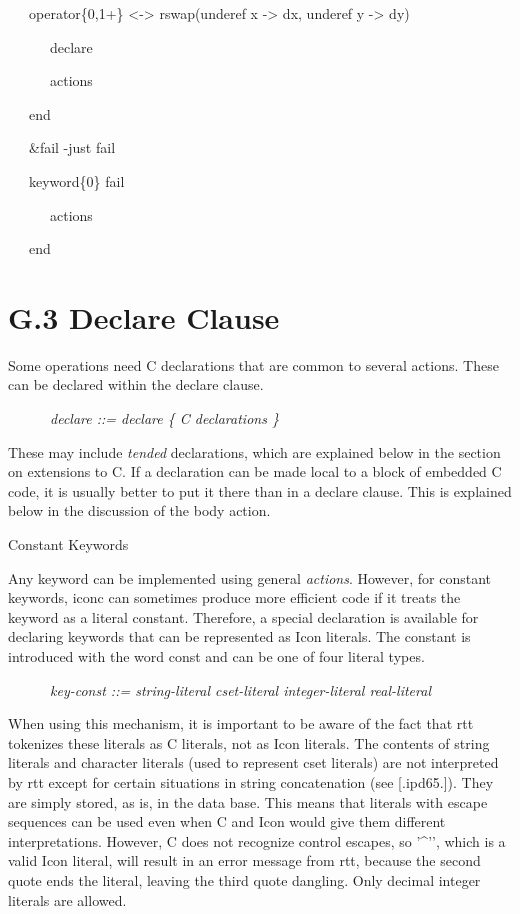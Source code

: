 {\ttfamily\mdseries
\ \ \ operator\{0,1+\} {\textless}-{\textgreater} rswap(underef x -{\textgreater} dx, underef y -{\textgreater} dy)}

{\ttfamily\mdseries
\ \ \ \ \ \ declare}

{\ttfamily\mdseries
\ \ \ \ \ \ actions}

{\ttfamily\mdseries
\ \ \ end}


\bigskip

{\ttfamily\mdseries
\ \ \ \&fail -just fail}

{\ttfamily\mdseries
\ \ \ keyword\{0\} fail}

{\ttfamily\mdseries
\ \ \ \ \ \ actions}

{\ttfamily\mdseries
\ \ \ end}


\section{G.3 Declare Clause}

Some operations need C declarations that are common to several
actions. These can be declared within the declare clause.


{\ttfamily\mdseries
\ \ \ \ \ \ \textit{declare ::= declare \{ C declarations \}}}


These may include \textit{tended} declarations, which are explained
below in the section on extensions to C. If a declaration can be made
local to a block of embedded C code, it is usually better to put it
there than in a declare clause. This is explained below in the
discussion of the body action.

{\sffamily
Constant Keywords}

Any keyword can be implemented using general
\textit{actions}. However, for constant keywords, iconc can sometimes
produce more efficient code if it treats the keyword as a literal
constant. Therefore, a special declaration is available for declaring
keywords that can be represented as Icon literals. The constant is
introduced with the word const and can be one of four literal types.

{\ttfamily\mdseries
\ \ \ \ \ \ \textit{key-const ::= string-literal {\textbar} cset-literal {\textbar} integer-literal {\textbar}
real-literal}}


When using this mechanism, it is important to be aware of the fact
that rtt tokenizes these literals as C literals, not as Icon
literals. The contents of string literals and character literals (used
to represent cset literals) are not interpreted by rtt except for
certain situations in string concatenation (see [.ipd65.]). They are
simply stored, as is, in the data base. This means that literals with
escape sequences can be used even when C and Icon would give them
different interpretations. However, C does not recognize control
escapes, so '\^{}'{}', which is a valid Icon literal, will result in
an error message from rtt, because the second quote ends the literal,
leaving the third quote dangling.  Only decimal integer literals are
allowed.


